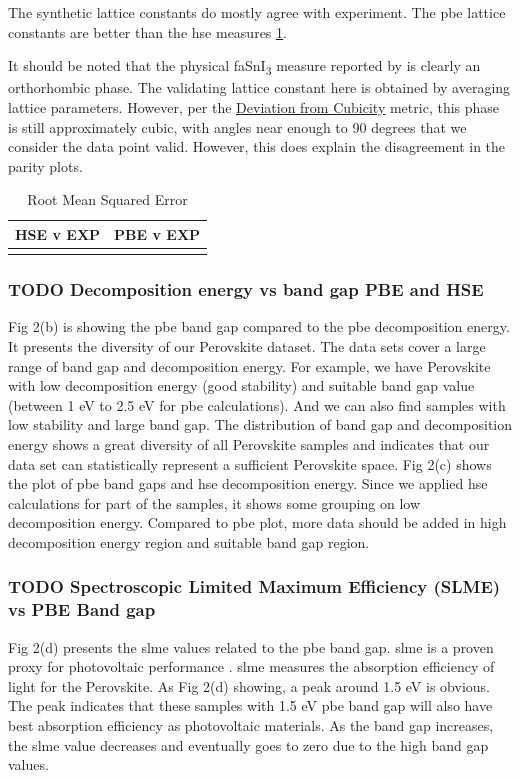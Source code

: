 \documentclass[twoside, twocolumn, 9pt, draft]{article}
\begin{document}
The synthetic lattice constants do mostly agree with experiment. The
\acrshort{pbe} lattice constants are better than the \acrshort{hse} measures \ref{tbl:verror}.

It should be noted that the physical \acrshort{fa}SnI\textsubscript{3} measure reported by
\citet{chen-2015-under-spotl} is clearly an orthorhombic phase. The
validating lattice constant here is obtained by averaging lattice
parameters. However, per the \hyperref[sec:org9618f97]{Deviation from Cubicity} metric, this
phase is still approximately cubic, with angles near enough to 90
degrees that we consider the data point valid. However, this does
explain the disagreement in the parity plots.

\begin{table}[htbp]
\caption{\label{tbl:verror} Root Mean Squared Error}
\centering
\begin{tabular}{ll}
HSE v EXP & PBE v EXP\\
\hline
 & \\
\end{tabular}
\end{table}

\subsubsection*{{\bfseries\sffamily TODO} Decomposition energy vs band gap PBE and HSE}
\label{sec:orga57fdd8}
Fig 2(b) is showing the \acrshort{pbe} band gap compared to the
\acrshort{pbe} decomposition energy. It presents the diversity
of our Perovskite dataset. The data sets cover a large range of band
gap and decomposition energy. For example, we have Perovskite with low
decomposition energy (good stability) and suitable band gap value
(between 1 eV to 2.5 eV for \acrshort{pbe} calculations). And
we can also find samples with low stability and large band gap. The
distribution of band gap and decomposition energy shows a great
diversity of all Perovskite samples and indicates that our data set
can statistically represent a sufficient Perovskite space. Fig 2(c)
shows the plot of \acrshort{pbe} band gaps and
\acrshort{hse} decomposition energy. Since we applied
\acrshort{hse} calculations for part of the samples, it shows
some grouping on low decomposition energy. Compared to
\acrshort{pbe} plot, more data should be added in high
decomposition energy region and suitable band gap region.

\subsubsection*{{\bfseries\sffamily TODO} Spectroscopic Limited Maximum Efficiency (SLME) vs PBE Band gap}
\label{sec:org53b1622}
Fig 2(d) presents the \gls{slme} values related to the
\acrshort{pbe} band gap. \gls{slme} is a proven proxy
for photovoltaic performance
\cite{yu-2012-ident-poten}. \gls{slme} measures the
absorption efficiency of light for the Perovskite. As Fig 2(d)
showing, a peak around 1.5 eV is obvious. The peak indicates that
these samples with 1.5 eV \acrshort{pbe} band gap will also
have best absorption efficiency as photovoltaic materials. As the band
gap increases, the \gls{slme} value decreases and eventually
goes to zero due to the high band gap values.
\end{document}
